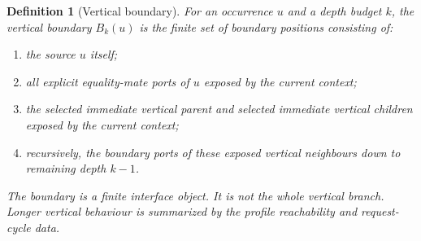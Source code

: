 \documentclass[11pt]{article}
\newtheorem{definition}[theorem]{Definition}
\begin{document}
\begin{definition}[Vertical boundary]\label{def:vertical-boundary}
For an occurrence $u$ and a depth budget $k$, the vertical boundary $B_k(u)$ is the finite set of boundary positions consisting of:
\begin{enumerate}[label=(B\arabic*)]
\item the source $u$ itself;
\item all explicit equality-mate ports of $u$ exposed by the current context;
\item the selected immediate vertical parent and selected immediate vertical children exposed by the current context;
\item recursively, the boundary ports of these exposed vertical neighbours down to remaining depth $k-1$.
\end{enumerate}
The boundary is a finite interface object.  It is not the whole vertical branch.  Longer vertical behaviour is summarized by the profile reachability and request-cycle data.
\end{definition}
\end{document}
